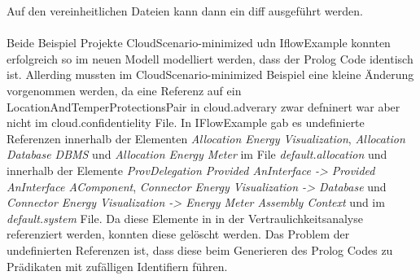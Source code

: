 \documentclass[twoside, ngerman]{sdqseminar}
\begin{document}
Auf den vereinheitlichen Dateien kann dann ein diff ausgeführt werden. \\ \\
Beide Beispiel Projekte CloudScenario-minimized udn IflowExample konnten erfolgreich so im neuen Modell modelliert werden, dass der Prolog Code identisch ist. Allerding mussten im CloudScenario-minimized Beispiel eine kleine Änderung vorgenommen werden, da eine Referenz auf ein LocationAndTemperProtectionsPair in cloud.adverary zwar defninert war aber nicht im cloud.confidentielity File. In IFlowExample gab es  undefinierte Referenzen innerhalb der Elementen \textit{Allocation Energy Visualization}, \textit{Allocation Database DBMS} und \textit{Allocation Energy Meter} im File \textit{default.allocation} und innerhalb der Elemente \textit{ProvDelegation Provided AnInterface -> Provided AnInterface AComponent}, \textit{Connector Energy Visualization -> Database} und \textit{Connector Energy Visualization -> Energy Meter Assembly Context} und im \textit{default.system} File. Da diese Elemente in in der Vertraulichkeitsanalyse referenziert werden, konnten diese gelöscht werden. Das Problem der undefinierten Referenzen ist, dass diese beim Generieren des Prolog Codes zu Prädikaten mit zufälligen Identifiern führen. 

\printbibliography
\end{document}
